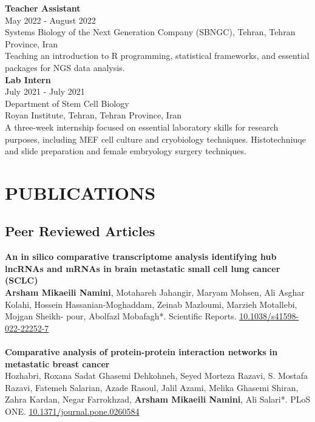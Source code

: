 \documentclass[a4paper,9pt]{extarticle}
\begin{document}
\noindent
\textbf{Teacher Assistant} \\
May 2022 - August 2022 \\
Systems Biology of the Next Generation Company (SBNGC), Tehran, Tehran Province, Iran \\
Teaching an introduction to R programming, statistical frameworks, and essential packages for NGS data analysis.\\

\noindent
\textbf{Lab Intern} \\
July 2021 - July 2021 \\
Department of Stem Cell Biology  \\
Royan Institute, Tehran, Tehran Province, Iran\\
A three-week internship focused on essential laboratory skills for research purposes, including MEF cell culture and cryobiology techniques. Histotechniuqe and slide preparation and female embryology surgery techniques. 


\section*{PUBLICATIONS}
 
\subsection*{Peer Reviewed Articles}
\textbf{An in silico comparative transcriptome analysis identifying hub lncRNAs and mRNAs in brain metastatic small cell lung cancer (SCLC)} \\ 
\textbf{Arsham Mikaeili Namini}, Motahareh Jahangir, Maryam Mohsen, Ali Asghar Kolahi, Hossein Hassanian-Moghaddam, Zeinab Mazloumi, Marzieh Motallebi, Mojgan Sheikh- pour, Abolfazl Mobafagh*. Scientific Reports.  \href{https://www.nature.com/articles/s41598-022-22252-7}{10.1038/s41598-022-22252-7}\\
\\
\textbf{Comparative analysis of protein-protein interaction networks in metastatic breast cancer} \\ 
Hozhabri, Roxana Sadat Ghasemi Dehkohneh, Seyed Morteza Razavi, S. Mostafa Razavi, Fatemeh Salarian, Azade Rasoul, Jalil Azami, Melika Ghasemi Shiran, Zahra Kardan, Negar Farrokhzad, \textbf{Arsham Mikaeili Namini}, Ali Salari*. PLoS ONE. \href{https://doi.org/10.1371/journal.pone.0260584}{10.1371/journal.pone.0260584}
\end{document}
